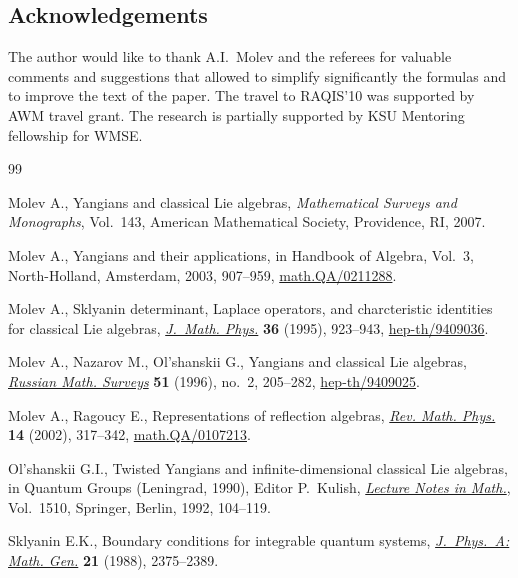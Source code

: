 \documentclass[pdftex]{sigma}
\begin{document}
\subsection*{Acknowledgements}
The author would like to thank A.I.~Molev and the referees   for valuable comments and suggestions that allowed to  simplify signif\/icantly the formulas and to improve the text of the paper. The travel to  RAQIS'10  was supported by AWM travel grant.
The research is partially supported by  KSU Mentoring fellowship for WMSE.

\vspace{-1mm}

\begin{thebibliography}{99}

\footnotesize\itemsep=-1pt

Molev A.,
Yangians and classical Lie algebras,
 {\it Mathematical Surveys and Monographs},  Vol.~143, American Mathematical Society, Providence, RI, 2007.

Molev A.,
Yangians and their applications,
in  Handbook of Algebra,  Vol.~3, North-Holland, Amsterdam, 2003,  907--959,
\href{http://arxiv.org/abs/math.QA/0211288}{math.QA/0211288}.


Molev A.,
Sklyanin determinant, Laplace operators, and charcteristic identities for classical Lie algebras,
\href{http://dx.doi.org/10.1063/1.531366}{{\it J.~Math. Phys.}} \textbf{36}  (1995), 923--943,
\href{http://arxiv.org/abs/hep-th/9409036}{hep-th/9409036}.

Molev A., Nazarov M., Ol'shanskii G.,
Yangians and classical Lie algebras,
\href{http://dx.doi.org/10.1070/RM1996v051n02ABEH002772}{{\it Russian Math. Surveys}} \textbf{51}   (1996), no.~2, 205--282,
\href{http://arxiv.org/abs/hep-th/9409025}{hep-th/9409025}.

 Molev A., Ragoucy E.,
Representations of ref\/lection algebras,
\href{http://dx.doi.org/10.1142/S0129055X02001156}{{\it Rev. Math. Phys.}} \textbf{14} (2002),  317--342,
\href{http://arxiv.org/abs/math.QA/0107213}{math.QA/0107213}.

Ol'shanskii G.I.,
Twisted Yangians and inf\/inite-dimensional classical Lie algebras,
in  Quantum Groups (Leningrad, 1990),  Editor    P.~Kulish,  \href{http://dx.doi.org/10.1007/BFb0101183}{{\it Lecture Notes in Math.}}, Vol.~1510, Springer, Berlin, 1992, 104--119.


Sklyanin E.K.,
Boundary conditions for integrable quantum systems,
\href{http://dx.doi.org/10.1088/0305-4470/21/10/015}{{\it J.~Phys.~A: Math. Gen.}} \textbf{21} (1988),  2375--2389.

\end{thebibliography}\LastPageEnding

 
\end{document}
